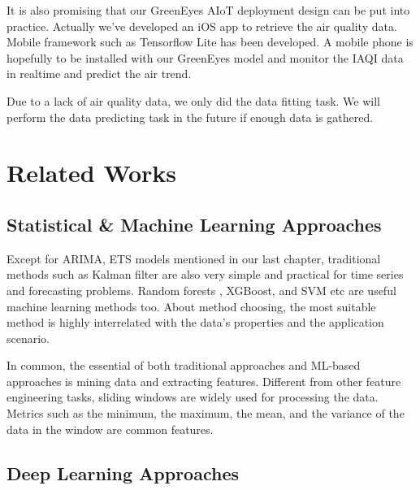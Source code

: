 \documentclass[
twocolumn,
]{ceurart}
\begin{document}


It is also promising that our GreenEyes AIoT deployment design can be put into practice. Actually we've developed an iOS app to retrieve the air quality data. Mobile framework such as Tensorflow Lite \cite{louis2019towards} has been developed. A mobile phone is hopefully to be installed with our GreenEyes model and monitor the IAQI data in realtime and predict the air trend.

Due to a lack of air quality data, we only did the data fitting task. We will perform the data predicting task in the future if enough data is gathered.

\section{Related Works}
\subsection{Statistical \& Machine Learning Approaches}

Except for ARIMA, ETS models mentioned in our last chapter, traditional methods such as Kalman filter \cite{gomez1994estimation} are also very simple and practical for time series and forecasting problems. Random forests \cite{rouet2017machine}, XGBoost, and SVM \cite{sapankevych2009time} etc are useful machine learning methods too. About method choosing, the most suitable method is highly interrelated with the data's properties and the application scenario. 

In common, the essential of both traditional approaches and ML-based approaches is mining data and extracting features. Different from other feature engineering tasks, sliding windows are widely used for processing the data. Metrics such as the minimum, the maximum, the mean, and the variance of the data in the window are common features.

\subsection{Deep Learning Approaches}
\end{document}

